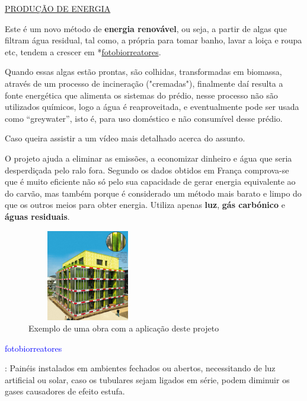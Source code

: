 \documentclass[letterpaper,12pt]{article}
\begin{document}
\newpage
\underline{PRODUÇÃO DE ENERGIA}
\vspace{0.5cm}
\par \citep{cerri_sistema}Este é um novo método de {\bf energia renovável}, ou seja, a partir de algas que filtram água residual, tal como, a própria para tomar banho, lavar a loiça e roupa etc, tendem a crescer em *\hyperlink{thesentence}{fotobiorreatores}.
\par Quando essas algas estão prontas, são colhidas, transformadas em biomassa, através de um processo de incineração ("cremadas"), finalmente daí resulta a fonte energética que alimenta os sistemas do prédio, nesse processo não são utilizados químicos, logo a água é reaproveitada, e eventualmente pode ser usada como “greywater”, isto é, para uso doméstico e não consumível desse prédio.
\par Caso queira assistir a um vídeo mais detalhado acerca do assunto.
\begin{center}
\end{center}
\par O projeto ajuda a eliminar as emissões, a economizar dinheiro e água que seria desperdiçada pelo ralo fora. Segundo os dados obtidos em França comprova-se que é muito eficiente não só pelo sua capacidade de gerar energia equivalente ao do carvão, mas também porque é considerado um método mais barato e limpo do que os outros meios para obter energia. Utiliza apenas {\bf luz}, {\bf gás carbónico} e {\bf águas residuais}.\\[0.3cm]
\begin{figure}[h!]
    \centering
    \includegraphics[width = 200px, height = 150px]{algas.jpg}
    \caption{Exemplo de uma obra com a aplicação deste projeto}
    \label{fig:algas}
\end{figure}
\par*\hypertarget{thesentence}{\textcolor{blue}{fotobiorreatores}}: Painéis instalados em ambientes fechados ou abertos, necessitando de luz artificial ou solar, caso os tubulares sejam ligados em série, podem diminuir os gases causadores de efeito estufa.
\newpage
\end{document}
